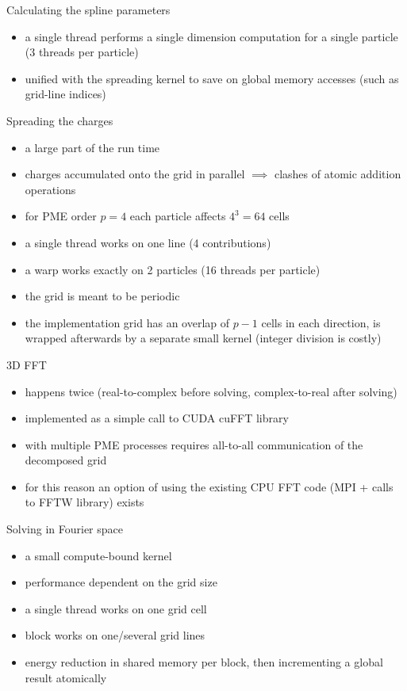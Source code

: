 \documentclass[11pt]{beamer}
\begin{document}
\begin{frame}{Calculating the spline parameters}
\begin{itemize}
\item a single thread performs a single dimension computation for a single particle (3 threads per particle)
\item unified with the spreading kernel to save on global memory accesses (such as grid-line indices) 
\end{itemize}
\end{frame}

\begin{frame}{Spreading the charges}
\begin{itemize}
\item a large part of the run time
\item charges accumulated onto the grid in parallel $\implies$ clashes of atomic 
addition operations
\item for PME order $p=4$ each particle affects $4^3 = 64$ cells
\item a single thread works on one line (4 contributions)
\item a warp works exactly on 2 particles (16 threads per particle)
\item the grid is meant to be periodic
\item the implementation grid has an overlap of $p - 1$ cells in each direction, is wrapped afterwards by a separate small kernel (integer division is costly)
\end{itemize}
\end{frame}

\begin{frame}{3D FFT}
\begin{itemize}
\item happens twice (real-to-complex before solving, complex-to-real after solving)
\item implemented as a simple call to CUDA cuFFT library
\item with multiple PME processes requires all-to-all communication of the decomposed grid
\item for this reason an option of using the existing CPU FFT code (MPI + calls to FFTW library) exists
\end{itemize}
\end{frame}

\begin{frame}{Solving in Fourier space}
\begin{itemize}
\item a small compute-bound kernel
\item performance dependent on the grid size
\item a single thread works on one grid cell
\item block works on one/several grid lines
\item energy reduction in shared memory per block, then incrementing a global result atomically
\end{itemize}
\end{frame}
\end{document}
